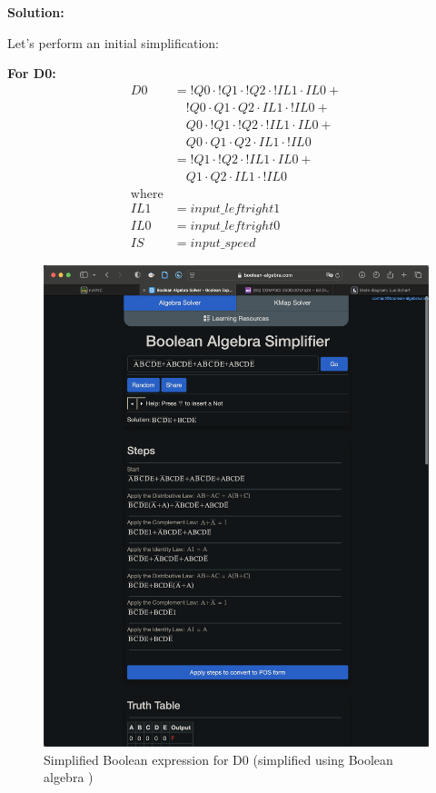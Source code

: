 \textbf{Solution:}

\noindent
Let's perform an initial simplification:

\begin{multicols}{2}
\textbf{For D0:}
\begin{align*}
    D0 &= !Q0 \cdot !Q1 \cdot !Q2 \cdot !IL1 \cdot IL0 + \\
       &\quad !Q0 \cdot Q1 \cdot Q2 \cdot IL1 \cdot !IL0 + \\
       &\quad Q0 \cdot !Q1 \cdot !Q2 \cdot !IL1 \cdot IL0 + \\
       &\quad Q0 \cdot Q1 \cdot Q2 \cdot IL1 \cdot !IL0 \\
    &= !Q1 \cdot !Q2 \cdot !IL1 \cdot IL0 + \\
    &\quad Q1 \cdot Q2 \cdot IL1 \cdot !IL0 \\
    \text{where} \\
    IL1 &= input\_leftright1 \\
    IL0 &= input\_leftright0 \\
    IS &= input\_speed
\end{align*}
\columnbreak
\begin{figure}[H]
    \centering
    \includegraphics[width=0.66\linewidth]{figures/D0simp.png}
    \caption{Simplified Boolean expression for D0 (simplified using Boolean algebra \cite{boolean-algebra})}
\end{figure}
\end{multicols}


